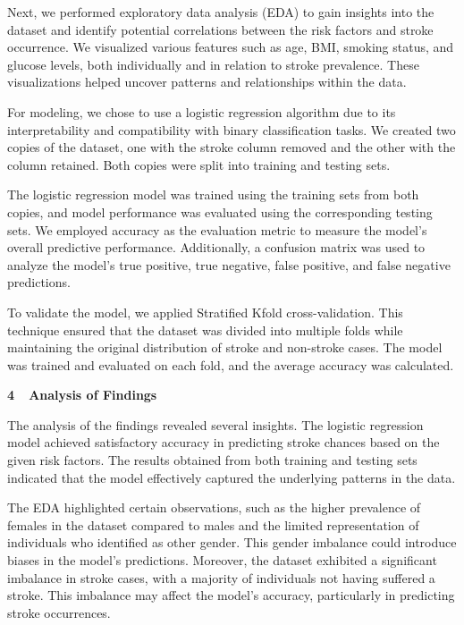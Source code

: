 \documentclass[letterpaper]{article}
\begin{document}
{
Next, we performed exploratory data analysis (EDA) to gain insights into the dataset and identify potential correlations
between the risk factors and stroke occurrence. We visualized various features such as age, BMI, smoking status, and
glucose levels, both individually and in relation to stroke prevalence. These visualizations helped uncover patterns
and relationships within the data.}

{
For modeling, we chose to use a logistic regression algorithm due to its interpretability and compatibility with binary
classification tasks. We created two copies of the dataset, one with the stroke column removed and the other with the
column retained. Both copies were split into training and testing sets.}


\bigskip

{
The logistic regression model was trained using the training sets from both copies, and model performance was evaluated
using the corresponding testing sets. We employed accuracy as the evaluation metric to measure the model's overall
predictive performance. Additionally, a confusion matrix was used to analyze the model's true positive, true negative,
false positive, and false negative predictions.}


\bigskip

{
To validate the model, we applied Stratified Kfold cross-validation. This technique ensured that the dataset was divided
into multiple folds while maintaining the original distribution of stroke and non-stroke cases. The model was trained
and evaluated on each fold, and the average accuracy was calculated.}


\bigskip


\bigskip


\bigskip


\bigskip

{
\textbf{4\ \ Analysis of Findings}}

{
The analysis of the findings revealed several insights. The logistic regression model achieved satisfactory accuracy in
predicting stroke chances based on the given risk factors. The results obtained from both training and testing sets
indicated that the model effectively captured the underlying patterns in the data.}


\bigskip

{
The EDA highlighted certain observations, such as the higher prevalence of females in the dataset compared to males and
the limited representation of individuals who identified as {\textquotedbl}other{\textquotedbl} gender. This gender
imbalance could introduce biases in the model's predictions. Moreover, the dataset exhibited a significant imbalance in
stroke cases, with a majority of individuals not having suffered a stroke. This imbalance may affect the model's
accuracy, particularly in predicting stroke occurrences.}
\end{document}

